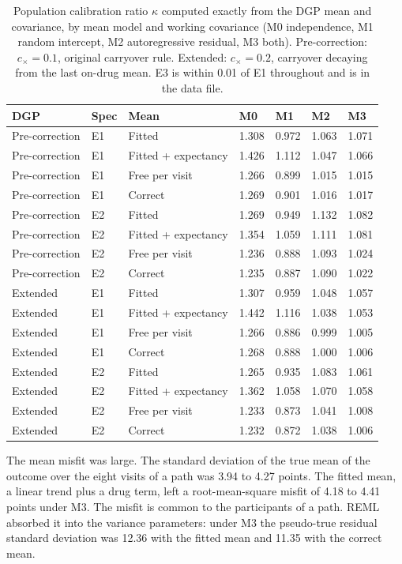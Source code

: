 \documentclass[
  11pt,
]{article}
\begin{document}
\begin{longtable}[t]{lllllll}
\caption{\label{tab:tab-analytic}Population calibration ratio $\kappa$ computed exactly from the DGP mean and covariance, by mean model and working covariance (M0 independence, M1 random intercept, M2 autoregressive residual, M3 both). Pre-correction: $c_\times = 0.1$, original carryover rule. Extended: $c_\times = 0.2$, carryover decaying from the last on-drug mean. E3 is within 0.01 of E1 throughout and is in the data file.}\\
\toprule
DGP & Spec & Mean & M0 & M1 & M2 & M3\\
\midrule
Pre-correction & E1 & Fitted & 1.308 & 0.972 & 1.063 & 1.071\\
Pre-correction & E1 & Fitted + expectancy & 1.426 & 1.112 & 1.047 & 1.066\\
Pre-correction & E1 & Free per visit & 1.266 & 0.899 & 1.015 & 1.015\\
Pre-correction & E1 & Correct & 1.269 & 0.901 & 1.016 & 1.017\\
Pre-correction & E2 & Fitted & 1.269 & 0.949 & 1.132 & 1.082\\
\addlinespace
Pre-correction & E2 & Fitted + expectancy & 1.354 & 1.059 & 1.111 & 1.081\\
Pre-correction & E2 & Free per visit & 1.236 & 0.888 & 1.093 & 1.024\\
Pre-correction & E2 & Correct & 1.235 & 0.887 & 1.090 & 1.022\\
Extended & E1 & Fitted & 1.307 & 0.959 & 1.048 & 1.057\\
Extended & E1 & Fitted + expectancy & 1.442 & 1.116 & 1.038 & 1.053\\
\addlinespace
Extended & E1 & Free per visit & 1.266 & 0.886 & 0.999 & 1.005\\
Extended & E1 & Correct & 1.268 & 0.888 & 1.000 & 1.006\\
Extended & E2 & Fitted & 1.265 & 0.935 & 1.083 & 1.061\\
Extended & E2 & Fitted + expectancy & 1.362 & 1.058 & 1.070 & 1.058\\
Extended & E2 & Free per visit & 1.233 & 0.873 & 1.041 & 1.008\\
\addlinespace
Extended & E2 & Correct & 1.232 & 0.872 & 1.038 & 1.006\\
\bottomrule
\end{longtable}

The mean misfit was large. The standard deviation of the true mean of
the outcome over the eight visits of a path was
3.94
to 4.27
points. The fitted mean, a linear trend plus a drug term, left a
root-mean-square misfit of
4.18 to 4.41 points under M3. The
misfit is common to the participants of a path. REML absorbed it into
the variance parameters: under M3 the pseudo-true residual standard
deviation was 12.36 with
the fitted mean and 11.35
with the correct mean.
\end{document}
